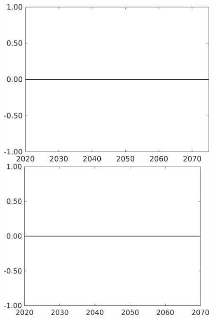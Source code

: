 \documentclass[12pt]{article}
\begin{document}
\begin{figure}[h!!]
\begin{minipage}[]{0.32\textwidth}
	\end{minipage}
	\begin{minipage}[]{0.32\textwidth}
		\includegraphics[width=1\textwidth]{../../codding_model/own_basedOnFried/optimalPol_010922_revision/figures/all_13Sept22/CompTaufPER_bytaul_Reg0_sn_spillover0_nsk0_xgr1_knspil0_sep1_LFlimit1_emsbase0_countec0_GovRev0_etaa0.79_lgd0.png}
	\end{minipage}		
	\begin{minipage}[]{0.32\textwidth}
		\includegraphics[width=1\textwidth]{../../codding_model/own_basedOnFried/optimalPol_010922_revision/figures/all_13Sept22/CompTaufPER_bytaul_Reg0_gAf_spillover0_nsk0_xgr1_knspil0_sep1_LFlimit1_emsbase0_countec0_GovRev0_etaa0.79_lgd0.png}

\end{minipage}
\end{figure}
\end{document}
